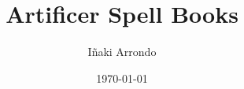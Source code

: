 \documentclass[a5paper,18pt]{book}
\title{Artificer Spell Books}
\author{Iñaki Arrondo}
\date{\today}
\begin{document}
\large

\maketitle

\tableofcontents
\end{document}
